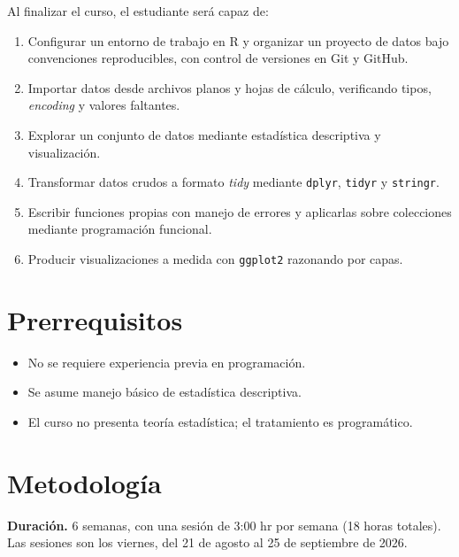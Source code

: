 \documentclass[11pt,letterpaper]{article}
\begin{document}
Al finalizar el curso, el estudiante será capaz de:

\begin{enumerate}[leftmargin=*]
    \item Configurar un entorno de trabajo en R y organizar un proyecto de datos bajo convenciones reproducibles, con control de versiones en Git y GitHub.
    \item Importar datos desde archivos planos y hojas de cálculo, verificando tipos, \textit{encoding} y valores faltantes.
    \item Explorar un conjunto de datos mediante estadística descriptiva y visualización.
    \item Transformar datos crudos a formato \textit{tidy} mediante \texttt{dplyr}, \texttt{tidyr} y \texttt{stringr}.
    \item Escribir funciones propias con manejo de errores y aplicarlas sobre colecciones mediante programación funcional.
    \item Producir visualizaciones a medida con \texttt{ggplot2} razonando por capas.
\end{enumerate}

\section{Prerrequisitos}

\begin{itemize}[leftmargin=*]
    \item No se requiere experiencia previa en programación.
    \item Se asume manejo básico de estadística descriptiva.
    \item El curso no presenta teoría estadística; el tratamiento es programático.
\end{itemize}

\section{Metodología}

\textbf{Duración.} 6 semanas, con una sesión de 3:00 hr por semana (18 horas totales). Las sesiones son los viernes, del 21 de agosto al 25 de septiembre de 2026.
\end{document}
